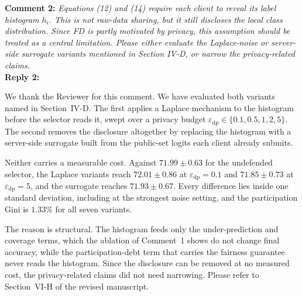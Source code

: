 \documentclass[10pt]{article}
\begin{document}
\noindent
\textbf{Comment 2:} \textit{Equations (12) and (14) require each client to reveal its label histogram $h_i$. This is not raw-data sharing, but it still discloses the local class distribution. Since FD is partly motivated by privacy, this assumption should be treated as a central limitation. Please either evaluate the Laplace-noise or server-side surrogate variants mentioned in Section IV-D, or narrow the privacy-related claims.} \\
\noindent
\textbf{Reply 2:} {We thank the Reviewer for this comment. We have evaluated both variants named in Section~IV-D. The first applies a Laplace mechanism to the histogram before the selector reads it, swept over a privacy budget $\varepsilon_{\mathrm{dp}} \in \{0.1, 0.5, 1, 2, 5\}$. The second removes the disclosure altogether by replacing the histogram with a server-side surrogate built from the public-set logits each client already submits.

Neither carries a measurable cost. Against $71.99 \pm 0.63$ for the undefended selector, the Laplace variants reach $72.01 \pm 0.86$ at $\varepsilon_{\mathrm{dp}} = 0.1$ and $71.85 \pm 0.73$ at $\varepsilon_{\mathrm{dp}} = 5$, and the surrogate reaches $71.93 \pm 0.67$. Every difference lies inside one standard deviation, including at the strongest noise setting, and the participation Gini is $1.33\%$ for all seven variants.

The reason is structural. The histogram feeds only the under-prediction and coverage terms, which the ablation of Comment~1 shows do not change final accuracy, while the participation-debt term that carries the fairness guarantee never reads the histogram. Since the disclosure can be removed at no measured cost, the privacy-related claims did not need narrowing. Please refer to Section~VI-H of the revised manuscript.}\\
\end{document}
